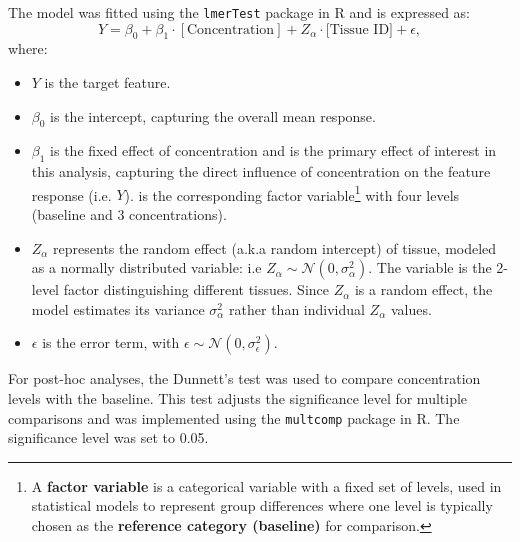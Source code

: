 \documentclass{report}
\begin{document}
            The model was fitted using the \texttt{lmerTest} \cite{lmertest} package in R and is expressed as:
            \[
            Y = \beta_0 + \beta_1 \cdot [\text{Concentration}] + Z_\alpha \cdot \text{[Tissue ID]} + \epsilon,
            \]
            where:
            \begin{itemize}
                \item \(Y\) is the target feature.
                \item \(\beta_0\) is the intercept, capturing the overall mean response.
                \item \(\beta_1\) is the fixed effect of concentration and is the primary effect of interest in this analysis, capturing the direct influence of concentration on the feature response (i.e. \(Y\)). \text{[Concentration]} is the corresponding factor variable\footnote{A \textbf{factor variable} is a categorical variable with a fixed set of levels, used in statistical models to represent group differences where one level is typically chosen as the \textbf{reference category (baseline)} for comparison.} with four levels (baseline and 3 concentrations).
                \item \(Z_\alpha\) represents the random effect (a.k.a random intercept) of tissue, modeled as a normally distributed variable: i.e \(Z_\alpha \sim \mathcal{N}(0, \sigma_\alpha^2)\). The variable \text{[Tissue ID]} is the  2-level factor distinguishing different tissues. Since $Z_\alpha$ is a random effect, the model estimates its variance $\sigma_\alpha^2$ rather than individual $Z_\alpha$ values.
                \item \(\epsilon\) is the error term, with \(\epsilon \sim \mathcal{N}(0, \sigma_\epsilon^2)\).
            \end{itemize}
            
            For post-hoc analyses, the Dunnett's test \cite{WikipediaDunnettTest} was used to compare concentration levels with the baseline. This test adjusts the significance level for multiple comparisons and was implemented using the \texttt{multcomp} \cite{multcomp} package in R. The significance level was set to 0.05.
            
\end{document}
